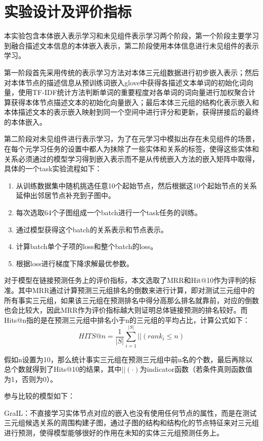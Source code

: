 \section{实验设计及评价指标}
本实验包含本体嵌入表示学习和未见组件表示学习两个阶段，第一个阶段主要学习到融合描述文本信息的本体嵌入表示，第二阶段使用本体信息进行未见组件的表示学习。

第一阶段首先采用传统的表示学习方法对本体三元组数据进行初步嵌入表示；然后对本体节点的描述信息从预训练词嵌入glove中获得各描述文本单词的初始化词向量，使用TF-IDF统计方法判断单词的重要程度对各单词的词向量进行加权聚合计算获得本体节点描述文本的初始化向量嵌入；最后本体三元组的结构化表示嵌入和本体描述文本的表示嵌入映射到同一个空间中进行评分和更新，获得拼接后的最终的本体嵌入。

第二阶段对未见组件进行表示学习，为了在元学习中模拟出存在未见组件的场景，在每个元学习任务的设置中都人为抹除了一些实体和关系的标签，使得这些实体和关系必须通过的模型学习得到嵌入表示而不是从传统嵌入方法的嵌入矩阵中取得，具体的一个task实验流程如下：
\begin{enumerate}[label=\arabic*)]
  \item 从训练数据集中随机挑选任意10个起始节点，然后根据这10个起始节点的关系延伸出邻居节点补充到子图中。
  \item 每次选取64个子图组成一个batch进行一个task任务的训练。
  \item 通过模型获得这个batch的关系表示和节点表示。
  \item 计算batch单个子项的loss和整个batch的loss。
  \item 根据loss进行梯度下降求解最优参数。
\end{enumerate}
对于模型在链接预测任务上的评价指标，本文选取了MRR和Hit@10作为评判的标准。其中MRR通过计算预测三元组排名的倒数来进行计算，即对测试三元组中的所有事实三元组，如果该三元组在预测排名中得分高那么排名就靠前，对应的倒数也会比较大，因此MRR作为评价指标越大则证明总体链接预测的排名较好。而Hits@n指的是在预测三元组中排名小于n的三元组的平均占比，计算公式如下：
\begin{equation}
  HITS@n = \frac{1}{|S|} \sum_{i=1}^{|S|}||(rank_{i} \leqslant n) \label{eq:4-1}
\end{equation}

假如n设置为10，那么统计事实三元组在预测三元组中前n名的个数，最后再除以总个数就得到了Hits@10的结果，其中\(||(·)\)为indicator函数（若条件真则函数值为1，否则为0）。

参与比较的模型如下：

GraIL：不直接学习实体节点对应的嵌入也没有使用任何节点的属性，而是在测试三元组候选关系的周围构建子图，通过子图的结构和结构化的节点特征来对三元组进行预测，使得模型能够很好的作用在未知的实体三元组预测任务上。


